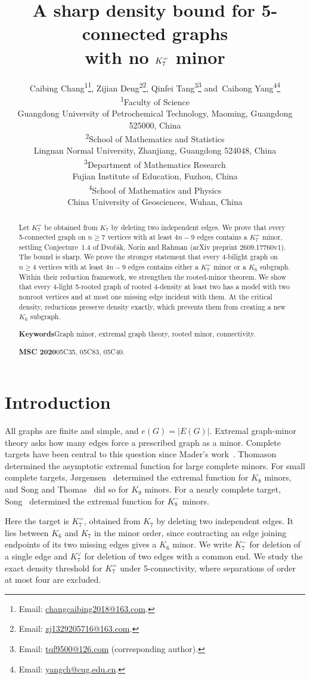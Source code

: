 \documentclass[11pt]{article}
\title{A sharp density bound for 5-connected graphs\\with no $\Ke$ minor}
\author{%
Caibing Chang\textsuperscript{1}\thanks{Email: \href{mailto:changcaibing2018@163.com}{changcaibing2018@163.com}.},\quad
Zijian Deng\textsuperscript{2}\thanks{Email: \href{mailto:zj1329205716@163.com}{zj1329205716@163.com}.},\quad
Qinfei Tang\textsuperscript{3}\thanks{Email: \href{mailto:tqf9500@126.com}{tqf9500@126.com} (corresponding author).}\quad
and~Caihong Yang\textsuperscript{4}\thanks{Email: \href{mailto:yangch@cug.edu.cn}{yangch@cug.edu.cn}.}\\[0.9em]
\small\textsuperscript{1}Faculty of Science\\
\small Guangdong University of Petrochemical Technology, Maoming, Guangdong 525000, China\\[0.4em]
\small\textsuperscript{2}School of Mathematics and Statistics\\
\small Lingnan Normal University, Zhanjiang, Guangdong 524048, China\\[0.4em]
\small\textsuperscript{3}Department of Mathematics Research\\
\small Fujian Institute of Education, Fuzhou, China\\[0.4em]
\small\textsuperscript{4}School of Mathematics and Physics\\
\small China University of Geosciences, Wuhan, China}
\date{}
\theoremstyle{remark}
\numberwithin{equation}{section}
\newcommand{\Ke}{K_7^{=}}
\begin{document}
\maketitle
\begin{abstract}
Let $\Ke$ be obtained from $K_7$ by deleting two independent edges.
We prove that every 5-connected graph on $n\ge7$ vertices with at least $4n-9$ edges contains a $\Ke$ minor, settling Conjecture~1.4 of Dvo\v r\'ak, Norin and Rahman (arXiv preprint 2609.17760v1).
The bound is sharp. We prove the stronger statement that every $4$-bilight graph on $n\ge4$ vertices with at least $4n-9$ edges contains either a $\Ke$ minor or a $K_6$ subgraph.
Within their reduction framework, we strengthen the rooted-minor theorem. We show that every $4$-light 5-rooted graph of rooted $4$-density at least two has a model with two nonroot vertices and at most one missing edge incident with them.
At the critical density, reductions preserve density exactly, which prevents them from creating a new $K_6$ subgraph.

\medskip
\noindent\textbf{Keywords}\quad Graph minor, extremal graph theory, rooted minor, connectivity.

\smallskip
\noindent\textbf{MSC 2020}\quad 05C35, 05C83, 05C40.
\end{abstract}

\section{Introduction}
All graphs are finite and simple, and $e(G)=|E(G)|$. Extremal graph-minor theory asks how many edges force a prescribed graph as a minor. Complete targets have been central to this question since Mader's work~\cite{Mad68}. Thomason~\cite{Tho01} determined the asymptotic extremal function for large complete minors. For small complete targets, J{\o}rgensen~\cite{Jor94} determined the extremal function for $K_8$ minors, and Song and Thomas~\cite{ST06} did so for $K_9$ minors. For a nearly complete target, Song~\cite{Son05} determined the extremal function for $K_8^-$ minors.

Here the target is $\Ke$, obtained from $K_7$ by deleting two independent edges. It lies between $K_6$ and $K_7$ in the minor order, since contracting an edge joining endpoints of its two missing edges gives a $K_6$ minor. We write $K_7^-$ for deletion of a single edge and $K_7^{\vee}$ for deletion of two edges with a common end. We study the exact density threshold for $\Ke$ under 5-connectivity, where separations of order at most four are excluded.
\end{document}
